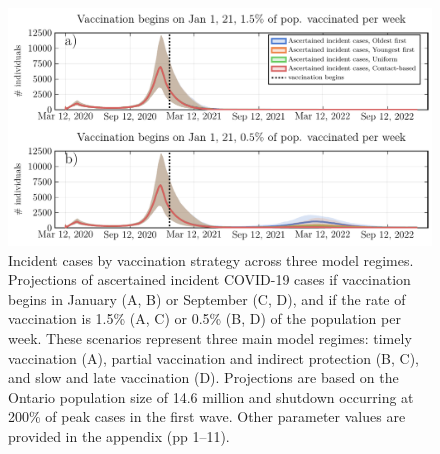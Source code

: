 \begin{figure}
\includegraphics[width=\textwidth]{chapter_3/main_text_ts_1.pdf}
\caption{Incident cases by vaccination strategy across three model regimes. Projections of ascertained incident COVID-19 cases if vaccination begins in January (A, B) or September (C, D), and if the rate of vaccination is 1.5\% (A, C) or 0.5\% (B, D) of the population per week. These scenarios represent three main model regimes: timely vaccination (A), partial vaccination and indirect protection (B, C), and slow and late vaccination (D). Projections are based on the Ontario population size of 14.6 million and shutdown occurring at 200\% of peak cases in the first wave. Other parameter values are provided in the appendix (pp 1–11).}
\label{fig3}
\end{figure}


